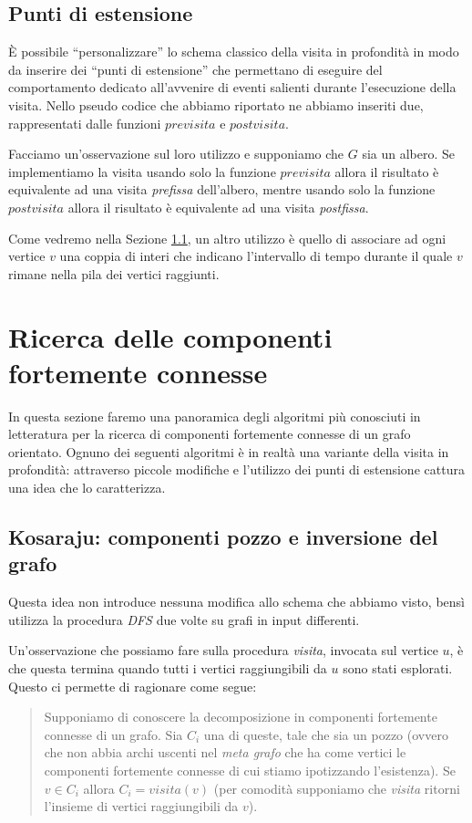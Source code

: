 \subsection{Punti di estensione}
\`E possibile ``personalizzare'' lo schema classico della visita in
profondit\`a in modo da inserire dei ``punti di estensione'' che
permettano di eseguire del comportamento dedicato all'avvenire di
eventi salienti durante l'esecuzione della visita. Nello pseudo codice
che abbiamo riportato ne abbiamo inseriti due, rappresentati dalle
funzioni $previsita$ e $postvisita$.

Facciamo un'osservazione sul loro utilizzo e supponiamo che $G$ sia un
albero. Se implementiamo la visita usando solo la funzione $previsita$
allora il risultato \`e equivalente ad una visita \emph{prefissa}
dell'albero, mentre usando solo la funzione $postvisita$ allora
il risultato \`e equivalente ad una visita \emph{postfissa}.

Come vedremo nella Sezione \ref{subsection:kosaraju-algorithm}, un
altro utilizzo \`e quello di associare ad ogni vertice $v$ una coppia
di interi che indicano l'intervallo di tempo durante il quale $v$
rimane nella pila dei vertici raggiunti.

\section{Ricerca delle componenti fortemente connesse}

In questa sezione faremo una panoramica degli algoritmi pi\`u
conosciuti in letteratura per la ricerca di componenti fortemente
connesse di un grafo orientato. Ognuno dei seguenti algoritmi \`e in
realt\`a una variante della visita in profondit\`a: attraverso piccole
modifiche e l'utilizzo dei punti di estensione cattura una idea che lo
caratterizza.

\subsection{Kosaraju: componenti pozzo e inversione del grafo}
\label{subsection:kosaraju-algorithm}
Questa idea non introduce nessuna modifica allo schema che abbiamo
visto, bens\`i utilizza la procedura \emph{DFS} due volte su grafi in
input differenti.

Un'osservazione che possiamo fare sulla procedura \emph{visita},
invocata sul vertice $u$, \`e che questa termina quando tutti i
vertici raggiungibili da $u$ sono stati esplorati. Questo ci permette
di ragionare come segue:
\begin{quotation}
  Supponiamo di conoscere la decomposizione in componenti fortemente
  connesse di un grafo. Sia $C_{i}$ una di queste, tale che sia un
  pozzo (ovvero che non abbia archi uscenti nel \emph{meta grafo} che
  ha come vertici le componenti fortemente connesse di cui stiamo
  ipotizzando l'esistenza). Se $v \in C_{i}$ allora $C_{i} =
  visita(v)$ (per comodit\`a supponiamo che \emph{visita} ritorni
  l'insieme di vertici raggiungibili da $v$).
\end{quotation}

